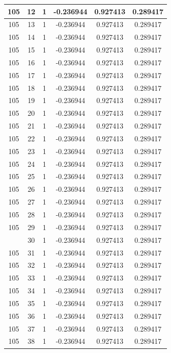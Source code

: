\documentclass[12pt,a4paper]{article}
\numberwithin{equation}{section}
\numberwithin{figure}{section}
\numberwithin{table}{section}
\begin{document}
\begin{longtable}{|c|c|c|c|c|c|}
105 & 12 & 1 & -0.236944 & 0.927413 & 0.289417 \\ \hline
105 & 13 & 1 & -0.236944 & 0.927413 & 0.289417 \\ \hline
105 & 14 & 1 & -0.236944 & 0.927413 & 0.289417 \\ \hline
105 & 15 & 1 & -0.236944 & 0.927413 & 0.289417 \\ \hline
105 & 16 & 1 & -0.236944 & 0.927413 & 0.289417 \\ \hline
105 & 17 & 1 & -0.236944 & 0.927413 & 0.289417 \\ \hline
105 & 18 & 1 & -0.236944 & 0.927413 & 0.289417 \\ \hline
105 & 19 & 1 & -0.236944 & 0.927413 & 0.289417 \\ \hline
105 & 20 & 1 & -0.236944 & 0.927413 & 0.289417 \\ \hline
105 & 21 & 1 & -0.236944 & 0.927413 & 0.289417 \\ \hline
105 & 22 & 1 & -0.236944 & 0.927413 & 0.289417 \\ \hline
105 & 23 & 1 & -0.236944 & 0.927413 & 0.289417 \\ \hline
105 & 24 & 1 & -0.236944 & 0.927413 & 0.289417 \\ \hline
105 & 25 & 1 & -0.236944 & 0.927413 & 0.289417 \\ \hline
105 & 26 & 1 & -0.236944 & 0.927413 & 0.289417 \\ \hline
105 & 27 & 1 & -0.236944 & 0.927413 & 0.289417 \\ \hline
105 & 28 & 1 & -0.236944 & 0.927413 & 0.289417 \\ \hline
105 & 29 & 1 & -0.236944 & 0.927413 & 0.289417 \\ \hline
\pagebreak
105 & 30 & 1 & -0.236944 & 0.927413 & 0.289417 \\ \hline
105 & 31 & 1 & -0.236944 & 0.927413 & 0.289417 \\ \hline
105 & 32 & 1 & -0.236944 & 0.927413 & 0.289417 \\ \hline
105 & 33 & 1 & -0.236944 & 0.927413 & 0.289417 \\ \hline
105 & 34 & 1 & -0.236944 & 0.927413 & 0.289417 \\ \hline
105 & 35 & 1 & -0.236944 & 0.927413 & 0.289417 \\ \hline
105 & 36 & 1 & -0.236944 & 0.927413 & 0.289417 \\ \hline
105 & 37 & 1 & -0.236944 & 0.927413 & 0.289417 \\ \hline
105 & 38 & 1 & -0.236944 & 0.927413 & 0.289417 \\ \hline

\end{longtable}
\end{document}
